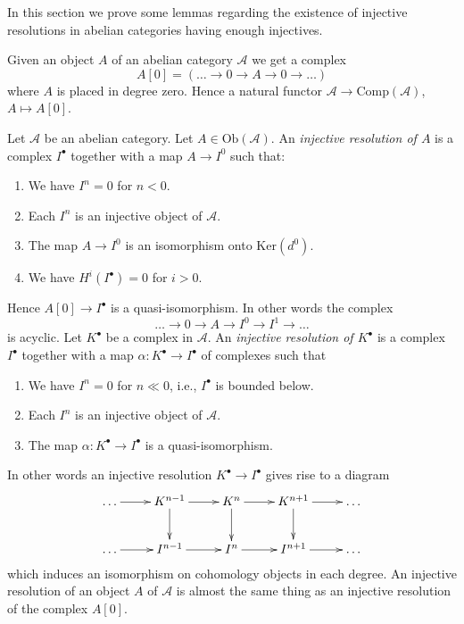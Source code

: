 \noindent
In this section we prove some lemmas regarding the existence
of injective resolutions in abelian categories having enough injectives.

\medskip\noindent
Given an object $A$ of an abelian category $\mathcal{A}$ we get a complex
$$
A[0] = ( \ldots \to 0 \to A \to 0 \to \ldots )
$$
where $A$ is placed in degree zero. Hence a natural functor
$\mathcal{A} \to \text{Comp}(\mathcal{A})$, $A \mapsto A[0]$.

\begin{definition}
\label{definition-injective-resolution}
Let $\mathcal{A}$ be an abelian category.
Let $A \in \text{Ob}(\mathcal{A})$.
An {\it injective resolution of $A$} is a complex
$I^\bullet$ together with a map $A \to I^0$ such
that:
\begin{enumerate}
\item We have $I^n = 0$ for $n < 0$.
\item Each $I^n$ is an injective object of $\mathcal{A}$.
\item The map $A \to I^0$ is an isomorphism onto $\text{Ker}(d^0)$.
\item We have $H^i(I^\bullet) = 0$ for $i > 0$.
\end{enumerate}
Hence $A[0] \to I^\bullet$ is a quasi-isomorphism.
In other words the complex
$$
\ldots \to 0 \to A \to I^0 \to I^1 \to \ldots
$$
is acyclic.
Let $K^\bullet$ be a complex in $\mathcal{A}$.
An {\it injective resolution of $K^\bullet$} is a complex
$I^\bullet$ together with a map $\alpha : K^\bullet \to I^\bullet$
of complexes such that
\begin{enumerate}
\item We have $I^n = 0$ for $n \ll 0$, i.e., $I^\bullet$ is bounded below.
\item Each $I^n$ is an injective object of $\mathcal{A}$.
\item The map $\alpha : K^\bullet \to I^\bullet$ is a
quasi-isomorphism.
\end{enumerate}
\end{definition}

\noindent
In other words an injective resolution $K^\bullet \to I^\bullet$
gives rise to a diagram
$$
\xymatrix{
\ldots \ar[r] & K^{n - 1} \ar[d] \ar[r] & K^n \ar[d] \ar[r] &
K^{n + 1} \ar[d] \ar[r] & \ldots \\
\ldots \ar[r] & I^{n - 1} \ar[r] & I^n \ar[r] & I^{n + 1} \ar[r] & \ldots
}
$$
which induces an isomorphism on cohomology objects in each degree.
An injective resolution of an object $A$ of $\mathcal{A}$
is almost the same thing as an injective resolution of
the complex $A[0]$.

